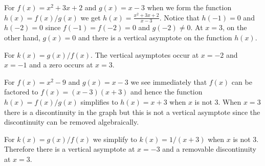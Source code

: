 \begin{activitySolution}
   \ba
        \item For $f(x) = x^2+3x+2$ and $g(x) = x-3$ when we form the function $h(x) =
            f(x)/g(x)$ we get $h(x) = \frac{x^2+3x+2}{x-3}$.  Notice that $h(-1) = 0$ and
            $h(-2) = 0$ since $f(-1) = f(-2) = 0$ and $g(-2) \neq 0$.  At $x=3$, on the
            other hand, $g(x) = 0$ and there is a vertical asymptote on the function
            $h(x)$.

            For $k(x) = g(x) / f(x)$.  The vertical asymptotes occur at $x=-2$ and $x=-1$
            and a zero occurs at $x=3$.
        \item For $f(x) = x^2-9$ and $g(x) = x-3$ we see immediately that $f(x)$ can be
            factored to $f(x) = (x-3)(x+3)$ and hence the function $h(x) = f(x)/g(x)$
            simplifies to $h(x) = x+3$ when $x$ is not $3$.  When $x=3$ there is a
            discontinuity in the graph but this is not a vertical asymptote since the
            discontinuity can be removed algebraically.

            For $k(x) = g(x)/f(x)$ we simplify to $k(x) = 1/(x+3)$ when $x$ is not $3$.
            Therefore there is a vertical asymptote at $x=-3$ and a removable
            discontinuity at $x=3$.
   \ea
\end{activitySolution}

\aftera
